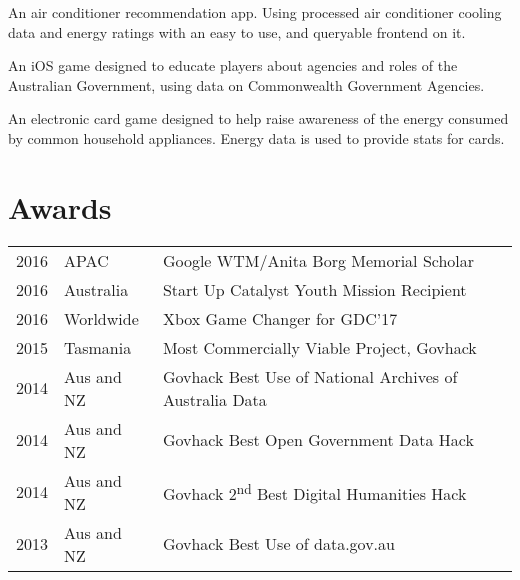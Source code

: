 \documentclass[a4paper]{deedy-resume} %
\begin{document}
\begin{minipage}[t]{0.66\textwidth}


An air conditioner recommendation app. Using processed air conditioner cooling data and energy ratings with an easy to use, and queryable frontend on it.

\sectionspace %



An iOS game designed to educate players about agencies and roles of the Australian Government, using data on Commonwealth Government Agencies.

\sectionspace %



An electronic card game designed to help raise awareness of the energy consumed by common household appliances. Energy data is used to provide stats for cards.%
\sectionspace %


\section{Awards}

\begin{tabular}{rll}
2016	 & APAC & Google WTM/Anita Borg Memorial Scholar\\
2016	 & Australia & Start Up Catalyst Youth Mission Recipient \\
2016	 & Worldwide & Xbox Game Changer for GDC'17\\
2015	 & Tasmania & Most Commercially Viable Project, Govhack\\
2014	 & Aus and NZ & Govhack Best Use of National Archives of Australia Data \\
2014	 & Aus and NZ & Govhack Best Open Government Data Hack \\
2014	 & Aus and NZ & Govhack 2\textsuperscript{nd} Best Digital Humanities Hack \\
2013	 & Aus and NZ & Govhack Best Use of data.gov.au \\
\end{tabular}


\end{minipage}
\end{document}
